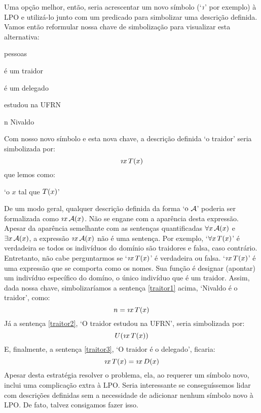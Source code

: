 Uma opção melhor, então, seria acrescentar um novo símbolo (`$\maththe$' por exemplo) à LPO e utilizá-lo junto com um predicado  para simbolizar uma descrição definida.
Vamos então reformular nossa chave de simbolização para visualizar esta alternativa:
\begin{center}
	\begin{ekey}
		\item[\text{domínio}] pessoas
		\item[\atom{T}{x}]  é um traidor
		\item[\atom{D}{x}]  é um delegado
		\item[\atom{U}{x}]  estudou na UFRN
		\item[n] Nivaldo
	\end{ekey}
\end{center}
Com nosso novo símbolo e esta nova chave, a descrição definida `o traidor' seria simbolizada por:
$$\maththe x\, \atom{T}{x}$$
que lemos como:
\begin{center}
	`o $x$ tal que $\mathord{T}(x)$'
\end{center}
De um modo geral, qualquer descrição definida da forma `$\text{o}\ \mathcal{A}$' poderia ser formalizada como
$\maththe x\, \atom{\meta{A}}{x}$.
Não se engane com a aparência desta expressão.
Apesar da aparência semelhante com as sentenças quantificadas $\forall x\, \mathord{\mathcal{A}}(x)$ e $\exists x\, \mathord{\mathcal{A}}(x)$, a expressão $\maththe x\, \atom{\meta{A}}{x}$ não é uma sentença.
Por exemplo, `$\forall x\, \mathord{T}(x)$' é verdadeira se todos os indivíduos do domínio são traidores e falsa, caso contrário.
Entretanto, não cabe perguntarmos se  `$\maththe x\, \atom{T}{x}$' é verdadeira ou falsa.
`$\maththe x\, \atom{T}{x}$' é uma expressão que se comporta como os nomes.
Sua função é designar (apontar) um indivíduo específico do domíno, o único indivíduo que é um traidor.
Assim, dada nossa chave, simbolizaríamos a sentença \ref{traitor1} acima, `Nivaldo é o traidor', como:
$$n = \maththe x\, \atom{T}{x}$$
Já a sentença \ref{traitor2}, `O traidor estudou na UFRN', seria simbolizada por:
$$\atom{U}{\maththe x\,\atom{T}{x}}$$
E, finalmente, a sentença \ref{traitor3}, `O traidor é o delegado', ficaria:
$$\maththe x\, \atom{T}{x} = \maththe x\, \atom{D}{x}$$
Apesar desta estratégia resolver o problema, ela, ao requerer um símbolo novo, inclui uma complicação extra à LPO.
Seria interessante se conseguíssemos lidar com descrições definidas sem a necessidade de adicionar nenhum símbolo novo à LPO.
De fato, talvez consigamos fazer isso.


